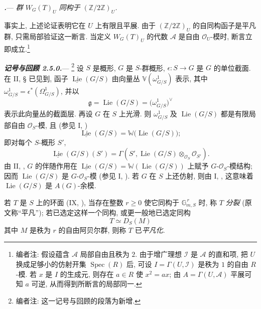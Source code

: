 \par\medskip\noindent
{}\textbf{\textit{.}}---
\textit{群 \(W_G(T)_U\) 同构于 \((\mathbb Z/2\mathbb Z)_U\).}

事实上, 上述论证表明它在 \(U\) 上有限且平展. 由于 \((\mathbb Z/2\mathbb Z)_U\) 的自同构函子是平凡群, 只需局部验证这一断言. 当定义 \(W_G(T)_U\) 的代数 \(\mathscr A\) 是自由 \(\mathcal O_U\)-模时, 断言立即成立.\footnote{编者注: 假设蕴含 \(\mathscr A\) 局部自由且秩为 \(2\). 由于增广理想 \(\mathscr I\) 是 \(\mathscr A\) 的直和项, 把 \(U\) 换成足够小的仿射开集 \(\operatorname{Spec}(R)\) 后, 可设 \(I=\Gamma(U,\mathscr I)\) 是秩为 \(1\) 的自由 \(R\)-模. 若 \(x\) 是 \(I\) 的生成元, 则存在 \(a\in R\) 使 \(x^2=ax\); 由 \(A=\Gamma(U,\mathscr A)\) 平展可知 \(a\) 可逆, 从而得到所断言的局部同一.}

\par\medskip\noindent
\textbf{\textit{记号与回顾 2.5.0.}}---%
\footnote{编者注: 这一记号与回顾的段落为新增.}
设 \(S\) 是概形, \(G\) 是 \(S\)-群概形, \(\epsilon\colon S\to G\) 是 \(G\) 的单位截面. 在 II, § 已见到, 函子 \(\underline{\operatorname{Lie}}(G/S)\) 由向量丛 \(\mathbb V(\omega^1_{G/S})\) 表示, 其中 \(\omega^1_{G/S}=\epsilon^{*}(\Omega^1_{G/S})\), 并以
\[
  \mathfrak g
  =
  \operatorname{Lie}(G/S)
  =
  \bigl(\omega^1_{G/S}\bigr)^{\vee}
\]
表示此向量丛的截面层. 再设 \(G\) 在 \(S\) 上光滑. 则 \(\omega^1_{G/S}\) 及 \(\operatorname{Lie}(G/S)\) 都是有限局部自由 \(\mathcal O_S\)-模, 且 (参见 I, )
\[
  \underline{\operatorname{Lie}}(G/S)
  =
  \mathbb W\bigl(\operatorname{Lie}(G/S)\bigr);
\]
即对每个 \(S\)-概形 \(S'\),
\[
  \underline{\operatorname{Lie}}(G/S)(S')
  =
  \Gamma\!\left(
    S',
    \operatorname{Lie}(G/S)\otimes_{\mathcal O_S}\mathcal O_{S'}
  \right).
\]
由 II, , \(G\) 的伴随作用在 \(\underline{\operatorname{Lie}}(G/S)=\mathbb W(\operatorname{Lie}(G/S))\) 上赋予 \(G\)-\(\mathcal O_S\)-模结构; 因而 \(\operatorname{Lie}(G/S)\) 是 \(G\)-\(\mathcal O_S\)-模 (参见 I, ). 若 \(G\) 在 \(S\) 上还仿射, 则由 I, , 这意味着 \(\operatorname{Lie}(G/S)\) 是 \(A(G)\)-余模.

若 \(T\) 是 \(S\) 上的环面 (IX, ), 当存在整数 \(r\geq 0\) 使它同构于 \(\mathbb G_{m,S}^{\,r}\) 时, 称 \(T\) \emph{分裂} (原文称“平凡”); 若已选定这样一个同构, 或更一般地已选定同构
\[
  T\simeq D_S(M)
\]
其中 \(M\) 是秩为 \(r\) 的自由阿贝尔群, 则称 \(T\) 已\emph{平凡化}.

